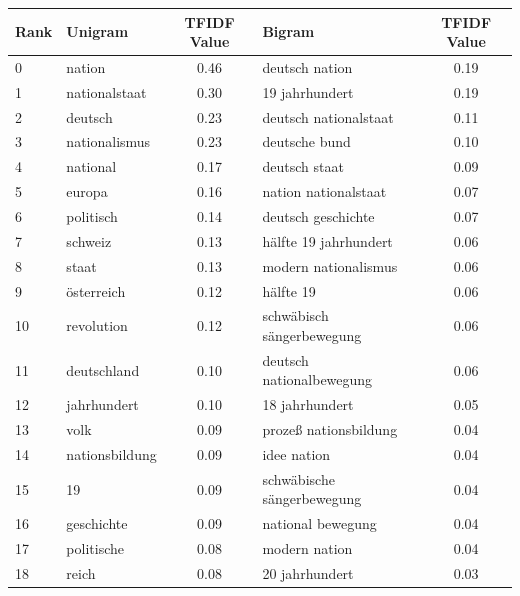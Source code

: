 \documentclass[11pt]{article}
\begin{document}
\begin{table}[H]
\begin{center}
\begin{small}
\label{TFIDF_Terms_Top_Twenty_Ge}
\begin{tabular*}{\textwidth}{|l|| @{\extracolsep{\fill}} l c || l c |} 
\hline
Rank & Unigram & TFIDF Value  & Bigram & TFIDF Value \\
\hline
\hline
0   &     nation  &  0.46  &           deutsch nation  &  0.19  \\
1   &        nationalstaat    &  0.30  &          19 jahrhundert  &  0.19  \\
2   &      deutsch   &  0.23  &         deutsch nationalstaat  &  0.11  \\
3   &        nationalismus   &  0.23  &    deutsche bund  &  0.10  \\
4   &       national    &  0.17  &  deutsch staat  &  0.09  \\
5   &       europa    &  0.16  &     nation nationalstaat  &  0.07  \\
6   &       politisch    &  0.14  &     deutsch geschichte  &  0.07  \\
7   &       schweiz    &  0.13  &   hälfte 19 jahrhundert  &  0.06  \\
8   &       staat    &  0.13  &      modern nationalismus &  0.06  \\
9   &    österreich    &  0.12  &     hälfte 19  &  0.06  \\
10  &     revolution    &  0.12  &    schwäbisch sängerbewegung  &  0.06  \\
11  &         deutschland    &  0.10  &    deutsch nationalbewegung &  0.06  \\
12  &    jahrhundert    &  0.10  &  18 jahrhundert  &  0.05  \\
13  &        volk    &  0.09  &    prozeß nationsbildung  &  0.04  \\
14  &        nationsbildung   &  0.09  &    idee nation  &  0.04  \\
15  &     19    &  0.09  &     schwäbische sängerbewegung  &  0.04  \\
16  &   geschichte    &  0.09  &     national bewegung  &  0.04  \\
17  &   politische    &  0.08  &   modern nation  &  0.04  \\
18  &  reich    &  0.08  &        20 jahrhundert  &  0.03  \\

\end{tabular*}
\end{small}
\end{center}
\end{table}
\end{document}
